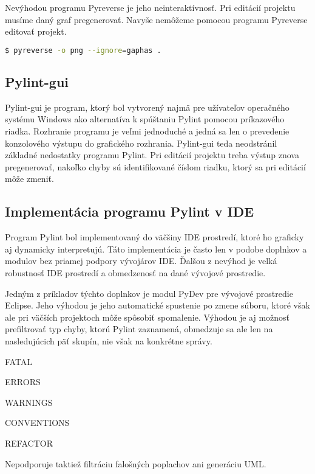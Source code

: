 \documentclass[11pt,oneside,final]{fithesis2}
\begin{document}
		Nevýhodou programu Pyreverse je jeho neinteraktívnosť. Pri editácií projektu musíme daný graf pregenerovať. Navyše nemôžeme pomocou programu Pyreverse editovať projekt.		
		
\begin{lstlisting}[language=bash]	
$ pyreverse -o png --ignore=gaphas .
\end{lstlisting}

 
 
	\subsection{Pylint-gui}
	
	Pylint-gui je program, ktorý bol vytvorený najmä pre užívateľov operačného systému Windows ako alternatíva k spúštaniu Pylint pomocou príkazového riadka. Rozhranie programu je veľmi jednoduché a jedná sa len o prevedenie konzolového výstupu do grafického rozhrania. Pylint-gui teda neodstránil základné nedostatky programu Pylint. Pri editácií projektu treba výstup znova pregenerovať, nakoľko chyby sú identifikované číslom riadku, ktorý sa pri editácií môže zmeniť.
	
	\subsection{Implementácia programu Pylint v IDE}
 
	Program Pylint bol implementovaný do väčšiny IDE prostredí, ktoré ho graficky aj dynamicky interpretujú. Táto implementácia je často len v podobe doplnkov a modulov bez priamej podpory vývojárov IDE. Ďalšou z nevýhod je velká robustnosť IDE prostredí a obmedzenosť na dané vývojové prostredie. 
	
	Jedným z príkladov týchto doplnkov je modul PyDev pre vývojové prostredie Eclipse. Jeho výhodou je jeho automatické spustenie po zmene súboru, ktoré však ale pri väčších projektoch môže spôsobiť spomalenie. Výhodou je aj možnosť prefiltrovať typ chyby, ktorú Pylint zaznamená, obmedzuje sa ale len na nasledujúcich päť skupín, nie však na konkrétne správy.

\begin{list}{•}{}
\item FATAL
\item ERRORS
\item WARNINGS
\item CONVENTIONS
\item REFACTOR
\end{list}
Nepodporuje taktiež filtráciu falošných poplachov ani generáciu UML.
	
\end{document}
